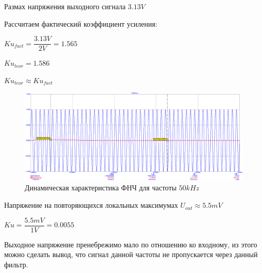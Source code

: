 \documentclass[a4paper,14pt]{article}
\begin{document}
Размах напряжения выходного сигнала $3.13V$

Рассчитаем фактический коэффициент усиления:

$Ku_{fact} = \dfrac{3.13V}{2V} = 1.565$

$Ku_{teor} = 1.586$

$Ku_{teor} \approx Ku_{fact}$

\begin{figure}[H]
	\centering
	\includegraphics[width=0.95\linewidth]{../imgs/FNCH/garm_50k_N}
	\caption{Динамическая характеристика ФНЧ для частоты $50kHz$}
	\label{fig:garm50kn}
\end{figure}

Напряжение на повторяющихся локальных максимумах $U_{out} \approx 5.5mV$

$Ku = \dfrac{5.5mV}{1V} = 0.0055$

Выходное напряжение пренебрежимо мало по отношению ко входному, из этого можно сделать вывод, что сигнал данной частоты не пропускается через данный фильтр.
\end{document}

